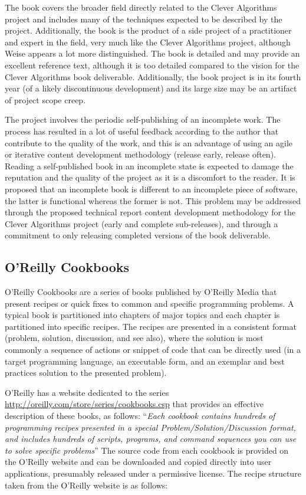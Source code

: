 \documentclass[a4paper, 11pt]{article}
\begin{document}
The book covers the broader field directly related to the Clever Algorithms project and includes many of the techniques expected to be described by the project. Additionally, the book is the product of a side project of a practitioner and expert in the field, very much like the Clever Algorithms project, although Weise appears a lot more distinguished. 
The book is detailed and may provide an excellent reference text, although it is too detailed compared to the vision for the Clever Algorithms book deliverable. Additionally, the book project is in its fourth year (of a likely discontinuous development) and its large size may be an artifact of project scope creep. 

The project involves the periodic self-publishing of an incomplete work. The process has resulted in a lot of useful feedback according to the author that contribute to the quality of the work, and this is an advantage of using an agile or iterative content development methodology (release early, release often). Reading a self-published book in an incomplete state is expected to damage the reputation and the quality of the project as it is a discomfort to the reader. It is proposed that an incomplete book is different to an incomplete piece of software, the latter is functional whereas the former is not. This problem may be addressed through the proposed technical report content development methodology for the Clever Algorithms project (early and complete sub-releases), and through a commitment to only releasing completed versions of the book deliverable.  

% 
% 
\subsection{O'Reilly Cookbooks}
O'Reilly Cookbooks are a series of books published by O'Reilly Media that present recipes or quick fixes to common and specific programming problems. A typical book is partitioned into chapters of major topics and each chapter is partitioned into specific recipes. The recipes are presented in a consistent format (problem, solution, discussion, and see also), where the solution is most commonly a sequence of actions or snippet of code that can be directly used (in a target programming language, an executable form, and an exemplar and best practices solution to the presented problem). 

O'Reilly has a website dedicated to the series \url{http://oreilly.com/store/series/cookbooks.csp} that provides an effective description of these books, as follows: ``\emph{Each cookbook contains hundreds of programming recipes presented in a special Problem/Solution/Discussion format, and includes hundreds of scripts, programs, and command sequences you can use to solve specific problems}'' The source code from each cookbook is provided on the O'Reilly website and can be downloaded and copied directly into user applications, presumably released under a permissive license. The recipe structure taken from the O'Reilly website is as follows:
\end{document}
